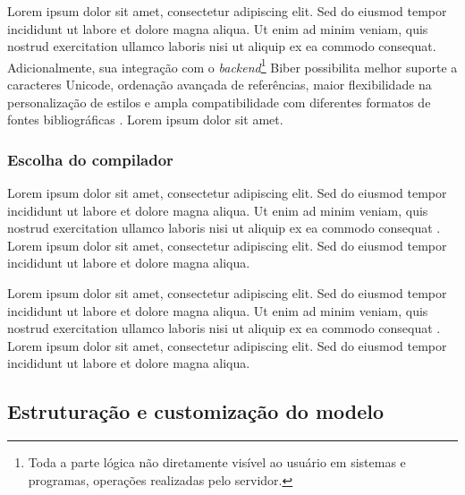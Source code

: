\documentclass[12pt,a4paper]{article}
\begin{document}


Lorem ipsum dolor sit amet, consectetur adipiscing elit. Sed do eiusmod tempor incididunt ut labore et dolore magna aliqua. Ut enim ad minim veniam, quis nostrud exercitation ullamco laboris nisi ut aliquip ex ea commodo consequat. Adicionalmente, sua integração com o \textit{backend}\footnote{Toda a parte lógica não diretamente visível ao usuário em sistemas e programas, operações realizadas pelo servidor.} Biber possibilita melhor suporte a caracteres Unicode, ordenação avançada de referências, maior flexibilidade na personalização de estilos e ampla compatibilidade com diferentes formatos de fontes bibliográficas \cite{biblatex_biber}. Lorem ipsum dolor sit amet.

\subsubsection{Escolha do compilador}

Lorem ipsum dolor sit amet, consectetur adipiscing elit. Sed do eiusmod tempor incididunt ut labore et dolore magna aliqua. Ut enim ad minim veniam, quis nostrud exercitation ullamco laboris nisi ut aliquip ex ea commodo consequat \cite{overleaf_tex_family_tree}. Lorem ipsum dolor sit amet, consectetur adipiscing elit. Sed do eiusmod tempor incididunt ut labore et dolore magna aliqua.

Lorem ipsum dolor sit amet, consectetur adipiscing elit. Sed do eiusmod tempor incididunt ut labore et dolore magna aliqua. Ut enim ad minim veniam, quis nostrud exercitation ullamco laboris nisi ut aliquip ex ea commodo consequat \cite{overleaf_tex_family_tree, luatexteam}. Lorem ipsum dolor sit amet, consectetur adipiscing elit. Sed do eiusmod tempor incididunt ut labore et dolore magna aliqua.

\subsection{Estruturação e customização do modelo}
\end{document}
